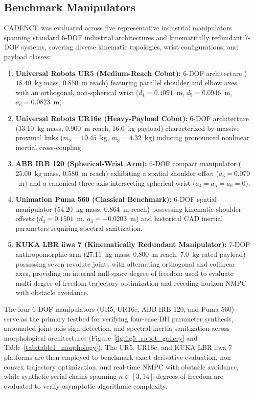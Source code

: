 \documentclass[fleqn,10pt]{article}
\begin{document}
\subsection{Benchmark Manipulators} \label{subsec:benchmark_platforms}
CADENCE was evaluated across five representative industrial manipulators spanning standard 6-DOF industrial architectures and kinematically redundant 7-DOF systems, covering diverse kinematic topologies, wrist configurations, and payload classes:
\begin{enumerate}
	\item \textbf{Universal Robots UR5 (Medium-Reach Cobot):} 6-DOF architecture ($18.40$~kg mass, $0.850$~m reach) featuring parallel shoulder and elbow axes with an orthogonal, non-spherical wrist ($d_4 = 0.1091$~m, $d_5 = 0.0946$~m, $a_6 = 0.0823$~m).
	\item \textbf{Universal Robots UR16e (Heavy-Payload Cobot):} 6-DOF architecture ($33.10$~kg mass, $0.900$~m reach, $16.0$~kg payload) characterized by massive proximal links ($m_2 = 10.45$~kg, $m_3 = 4.32$~kg) inducing pronounced nonlinear inertial cross-coupling.
	\item \textbf{ABB IRB 120 (Spherical-Wrist Arm):} 6-DOF compact manipulator ($25.00$~kg mass, $0.580$~m reach) exhibiting a spatial shoulder offset ($a_3 = 0.070$~m) and a canonical three-axis intersecting spherical wrist ($a_4 = a_5 = a_6 = 0$).
	\item \textbf{Unimation Puma 560 (Classical Benchmark):} 6-DOF spatial manipulator ($54.20$~kg mass, $0.864$~m reach) possessing kinematic shoulder offsets ($d_3 = 0.1501$~m, $a_3 = -0.0203$~m) and historical CAD inertial parameters requiring spectral sanitization.
	\item \textbf{KUKA LBR iiwa 7 (Kinematically Redundant Manipulator):} 7-DOF anthropomorphic arm ($27.11$~kg mass, $0.800$~m reach, $7.0$~kg rated payload) possessing seven revolute joints with alternating orthogonal and collinear axes, providing an internal null-space degree of freedom used to evaluate multi-degree-of-freedom trajectory optimization and receding-horizon NMPC with obstacle avoidance.
\end{enumerate}
The four 6-DOF manipulators (UR5, UR16e, ABB IRB 120, and Puma 560) serve as the primary testbed for verifying four-case DH parameter synthesis, automated joint-axis sign detection, and spectral inertia sanitization across morphological architectures (Figure~\ref{fig:fig5_robot_gallery} and Table~\ref{tab:table1_morphology}). The UR5, UR16e, and KUKA LBR iiwa 7 platforms are then employed to benchmark exact derivative evaluation, non-convex trajectory optimization, and real-time NMPC with obstacle avoidance, while synthetic serial chains spanning $n \in [3, 14]$ degrees of freedom are evaluated to verify asymptotic algorithmic complexity.
\end{document}
